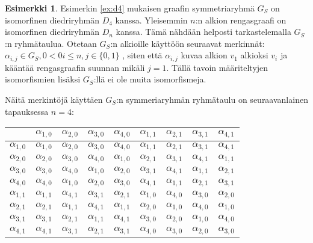 \documentclass[a4paper, 12pt]{article}
\theoremstyle{definition}
\newtheorem{example}[mydef]{Esimerkki}
\theoremstyle{plain}
\begin{document}
\begin{example}
Esimerkin \ref{ex:d4} mukaisen graafin symmetriaryhmä $G_S$ on isomorfinen diedriryhmän $D_4$ kanssa. Yleisemmin $n$:n alkion rengasgraafi on isomorfinen diedriryhmän $D_n$ kanssa. Tämä nähdään helposti tarkastelemalla $G_S$:n ryhmätaulua. Otetaan $G_S$:n alkioille käyttöön seuraavat merkinnät: $\alpha_{i, j} \in G_S, 0 <0 i \leq n, j \in \{0, 1\}$ , siten että $\alpha_{i, j}$ kuvaa alkion $v_1$ alkioksi $v_i$ ja kääntää rengasgraafin suunnan mikäli $j = 1$. Tällä tavoin määriteltyjen isomorfismien lisäksi $G_S$:llä ei ole muita isomorfismeja.

Näitä merkintöjä käyttäen $G_S$:n symmeriaryhmän ryhmätaulu on seuraavanlainen tapauksessa $n=4$:

\begin{center}
\begin{tabular} {l | l l l l l l l l}
	                & $\alpha_{1, 0}$ & $\alpha_{2, 0}$ & $\alpha_{3, 0}$ & $\alpha_{4, 0}$ & $\alpha_{1, 1}$ & $\alpha_{2, 1}$ & $\alpha_{3, 1}$ & $\alpha_{4, 1}$ \\
\hline
$\alpha_{1, 0}$ & $\alpha_{1, 0}$ & $\alpha_{2, 0}$ & $\alpha_{3, 0}$ & $\alpha_{4, 0}$ & $\alpha_{1, 1}$ & $\alpha_{2, 1}$ & $\alpha_{3, 1}$ & $\alpha_{4, 1}$ \\
$\alpha_{2, 0}$ & $\alpha_{2, 0}$ & $\alpha_{3, 0}$ & $\alpha_{4, 0}$ & $\alpha_{1, 0}$ & $\alpha_{2, 1}$ & $\alpha_{3, 1}$ & $\alpha_{4, 1}$ & $\alpha_{1, 1}$ \\
$\alpha_{3, 0}$ & $\alpha_{3, 0}$ & $\alpha_{4, 0}$ & $\alpha_{1, 0}$ & $\alpha_{2, 0}$ & $\alpha_{3, 1}$ & $\alpha_{4, 1}$ & $\alpha_{1, 1}$ & $\alpha_{2, 1}$ \\
$\alpha_{4, 0}$ & $\alpha_{4, 0}$ & $\alpha_{1, 0}$ & $\alpha_{2, 0}$ & $\alpha_{3, 0}$ & $\alpha_{4, 1}$ & $\alpha_{1, 1}$ & $\alpha_{2, 1}$ & $\alpha_{3, 1}$ \\
$\alpha_{1, 1}$ & $\alpha_{1, 1}$ & $\alpha_{4, 1}$ & $\alpha_{3, 1}$ & $\alpha_{2, 1}$ & $\alpha_{1, 0}$ & $\alpha_{4, 0}$ & $\alpha_{3, 0}$ & $\alpha_{2, 0}$ \\
$\alpha_{2, 1}$ & $\alpha_{2, 1}$ & $\alpha_{1, 1}$ & $\alpha_{4, 1}$ & $\alpha_{1, 1}$ & $\alpha_{2, 0}$ & $\alpha_{1, 0}$ & $\alpha_{4, 0}$ & $\alpha_{1, 0}$ \\
$\alpha_{3, 1}$ & $\alpha_{3, 1}$ & $\alpha_{2, 1}$ & $\alpha_{1, 1}$ & $\alpha_{4, 1}$ & $\alpha_{3, 0}$ & $\alpha_{2, 0}$ & $\alpha_{1, 0}$ & $\alpha_{4, 0}$ \\
$\alpha_{4, 1}$ & $\alpha_{4, 1}$ & $\alpha_{3, 1}$ & $\alpha_{2, 1}$ & $\alpha_{3, 1}$ & $\alpha_{4, 0}$ & $\alpha_{3, 0}$ & $\alpha_{2, 0}$ & $\alpha_{3, 0}$ \\
\end{tabular}
\end{center}


\end{example}
\end{document}
